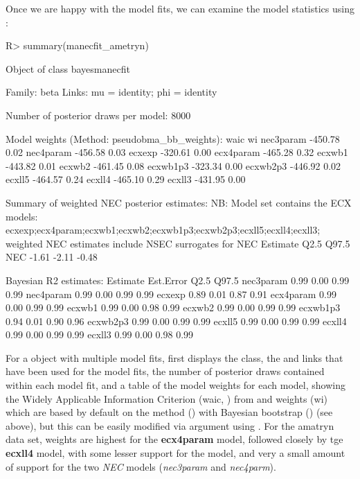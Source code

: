 \documentclass[
  shortnames]{jss}
\begin{document}
Once we are happy with the model fits, we can examine the model statistics using :

\begin{CodeChunk}
\begin{CodeInput}
R> summary(manecfit_ametryn)
\end{CodeInput}
\begin{CodeOutput}
Object of class bayesmanecfit

 Family: beta  
  Links: mu = identity; phi = identity  

Number of posterior draws per model:  8000

Model weights (Method: pseudobma_bb_weights):
             waic   wi
nec3param -450.78 0.02
nec4param -456.58 0.03
ecxexp    -320.61 0.00
ecx4param -465.28 0.32
ecxwb1    -443.82 0.01
ecxwb2    -461.45 0.08
ecxwb1p3  -323.34 0.00
ecxwb2p3  -446.92 0.02
ecxll5    -464.57 0.24
ecxll4    -465.10 0.29
ecxll3    -431.95 0.00


Summary of weighted NEC posterior estimates:
NB: Model set contains the ECX models: ecxexp;ecx4param;ecxwb1;ecxwb2;ecxwb1p3;ecxwb2p3;ecxll5;ecxll4;ecxll3; weighted NEC estimates include NSEC surrogates for NEC
    Estimate  Q2.5 Q97.5
NEC    -1.61 -2.11 -0.48


Bayesian R2 estimates:
          Estimate Est.Error Q2.5 Q97.5
nec3param     0.99      0.00 0.99  0.99
nec4param     0.99      0.00 0.99  0.99
ecxexp        0.89      0.01 0.87  0.91
ecx4param     0.99      0.00 0.99  0.99
ecxwb1        0.99      0.00 0.98  0.99
ecxwb2        0.99      0.00 0.99  0.99
ecxwb1p3      0.94      0.01 0.90  0.96
ecxwb2p3      0.99      0.00 0.99  0.99
ecxll5        0.99      0.00 0.99  0.99
ecxll4        0.99      0.00 0.99  0.99
ecxll3        0.99      0.00 0.98  0.99
\end{CodeOutput}
\end{CodeChunk}

For a  object with multiple model fits,  first displays the class, the  and links that have been used for the model fits, the number of posterior draws contained within each model fit, and a table of the model weights for each model, showing the Widely Applicable Information Criterion (waic, \citet{watanabe2010asymptotic}) from  and weights (wi) which are based by default on the  method () with Bayesian bootstrap () (see above), but this can be easily modified via argument  using . For the amatryn data set, weights are highest for the \textbf{ecx4param} model, followed closely by tge \textbf{ecxll4} model, with some lesser support for the  model, and very a small amount of support for the two \emph{NEC} models (\emph{nec3param} and \emph{nec4parm}).
\end{document}
